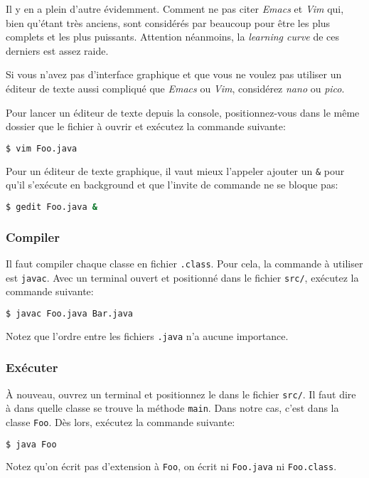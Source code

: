Il y en a plein d'autre évidemment. Comment ne pas citer {\em Emacs} et
{\em Vim} qui, bien qu'étant très anciens, sont considérés par beaucoup
pour être les plus complets et les plus puissants.
Attention néanmoins, la {\em learning curve} de ces derniers est assez raide.

Si vous n'avez pas d'interface graphique et que vous ne voulez pas utiliser
un éditeur de texte aussi compliqué que {\em Emacs} ou {\em Vim}, considérez
{\em nano} ou {\em pico}.

Pour lancer un éditeur de texte depuis la console,
positionnez-vous dans le même dossier que le fichier à ouvrir
et exécutez la commande suivante:
\begin{lstlisting}[language={sh}, morekeywords={vim}]
$ vim Foo.java
\end{lstlisting}
Pour un éditeur de texte graphique,
il vaut mieux l'appeler ajouter un \lstinline|&| pour qu'il s'exécute en
background et que l'invite de commande ne se bloque pas:

\begin{lstlisting}[language={sh}, morekeywords={gedit}]
$ gedit Foo.java &
\end{lstlisting}

\subsubsection{Compiler}
Il faut compiler chaque classe en fichier \lstinline|.class|.
Pour cela, la commande à utiliser est \lstinline|javac|.
Avec un terminal ouvert et positionné dans le fichier \lstinline|src/|,
exécutez la commande suivante:
\begin{lstlisting}[language={sh}, morekeywords={javac}]
$ javac Foo.java Bar.java
\end{lstlisting}
Notez que l'ordre entre les fichiers \lstinline|.java| n'a aucune importance.

\subsubsection{Exécuter}
À nouveau,
ouvrez un terminal et positionnez le dans le fichier \lstinline|src/|.
Il faut dire à \java{} dans quelle classe se trouve la méthode \lstinline|main|.
Dans notre cas, c'est dans la classe \lstinline|Foo|.
Dès lors, exécutez la commande suivante:
\begin{lstlisting}[language={sh}, morekeywords={java}]
$ java Foo
\end{lstlisting}
Notez qu'on écrit pas d'extension à \lstinline|Foo|,
on écrit ni \lstinline|Foo.java| ni \lstinline|Foo.class|.



